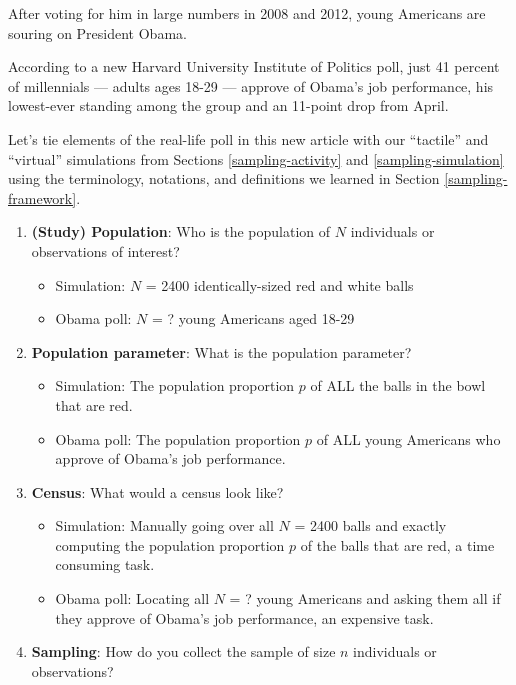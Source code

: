 \documentclass[12pt, krantz2,]{krantz}
\providecommand{\tightlist}{%
  \setlength{\itemsep}{0pt}\setlength{\parskip}{0pt}}
\renewenvironment{quote}{\begin{VF}}{\end{VF}}
\begin{document}
\begin{quote}
After voting for him in large numbers in 2008 and 2012, young Americans are souring on President Obama.

According to a new Harvard University Institute of Politics poll, just 41 percent of millennials --- adults ages 18-29 --- approve of Obama's job performance, his lowest-ever standing among the group and an 11-point drop from April.
\end{quote}

Let's tie elements of the real-life poll in this new article with our ``tactile'' and ``virtual'' simulations from Sections \ref{sampling-activity} and \ref{sampling-simulation} using the terminology, notations, and definitions we learned in Section \ref{sampling-framework}.

\begin{enumerate}
\def\labelenumi{\arabic{enumi}.}
\tightlist
\item
  \textbf{(Study) Population}: Who is the population of \(N\) individuals or observations of interest?

  \begin{itemize}
  \tightlist
  \item
    Simulation: \(N\) = 2400 identically-sized red and white balls
  \item
    Obama poll: \(N\) = ? young Americans aged 18-29
  \end{itemize}
\item
  \textbf{Population parameter}: What is the population parameter?

  \begin{itemize}
  \tightlist
  \item
    Simulation: The population proportion \(p\) of ALL the balls in the bowl that are red.
  \item
    Obama poll: The population proportion \(p\) of ALL young Americans who approve of Obama's job performance.
  \end{itemize}
\item
  \textbf{Census}: What would a census look like?

  \begin{itemize}
  \tightlist
  \item
    Simulation: Manually going over all \(N\) = 2400 balls and exactly computing the population proportion \(p\) of the balls that are red, a time consuming task.
  \item
    Obama poll: Locating all \(N\) = ? young Americans and asking them all if they approve of Obama's job performance, an expensive task.
  \end{itemize}
\item
  \textbf{Sampling}: How do you collect the sample of size \(n\) individuals or observations?


\end{enumerate}
\end{document}
